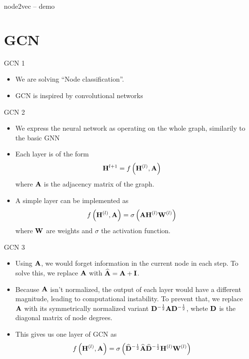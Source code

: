 \documentclass[10pt]{beamer}
\newcommand{\mathmat}{\ensuremath{\mathbf}}
\begin{document}
\begin{frame}{node2vec -- demo}
\end{frame}

\section{GCN}

\begin{frame}{GCN 1}
	\begin{itemize}
		\item We are solving \enquote{Node classification}.
		\item GCN is inspired by convolutional networks
	\end{itemize}
\end{frame}

\begin{frame}{GCN 2}
	\begin{itemize}
		\item We express the neural network as operating on the whole graph, similarily to the basic GNN
		\item Each layer is of the form
			\[ \mathmat{H}^{l + 1} = f \left( \mathmat{H}^{(l)}, \mathmat{A} \right) \]
			where \( \mathmat{A} \) is the adjacency matrix of the graph.
		\item A simple layer can be implemented as
			\[ f \left( \mathmat{H}^{(l)}, \mathmat{A} \right) = \sigma \left( \mathmat{A} \mathmat{H}^{(l)} \mathmat{W}^{(l)} \right) \]
			where \( \mathmat{W} \) are weights and \( \sigma \) the activation function.
	\end{itemize}
\end{frame}

\begin{frame}{GCN 3}
	\begin{itemize}
		\item Using \( \mathmat{A} \), we would forget information in the current node in each step. To solve this, we replace \( \mathmat{A} \) with \( \widehat{\mathmat{A}} = \mathmat{A} + \mathmat{I} \).
		\item Because \( \mathmat{A} \) isn't normalized, the output of each layer would have a different magnitude, leading to computational instability. To prevent that, we replace \( \mathmat{A} \) with its symmetrically normalized variant \( \mathmat{D}^{-\frac{1}{2}} \mathmat{A} \mathmat{D}^{-\frac{1}{2}} \), whete \( \mathmat{D} \) is the diagonal matrix of node degrees.
		\item This gives us one layer of GCN as
			\[ f \left( \mathmat{H}^{(l)}, \mathmat{A} \right) = \sigma \left( \widehat{\mathmat{D}}^{-\frac{1}{2}} \widehat{\mathmat{A}} \widehat{\mathmat{D}}^{-\frac{1}{2}} \mathmat{H}^{(l)} \mathmat{W}^{(l)} \right) \]
	\end{itemize}
\end{frame}
\end{document}
